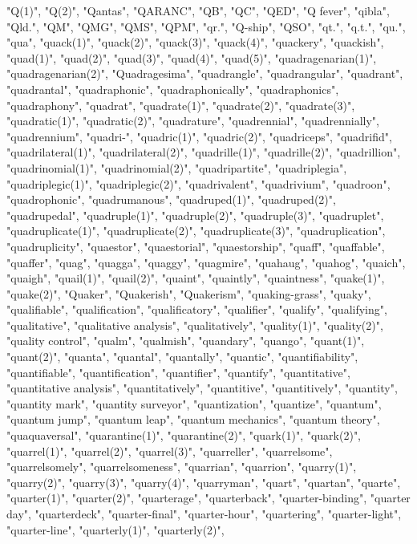 "Q(1)",
"Q(2)",
"Qantas",
"QARANC",
"QB",
"QC",
"QED",
"Q fever",
"qibla",
"Qld.",
"QM",
"QMG",
"QMS",
"QPM",
"qr.",
"Q-ship",
"QSO",
"qt.",
"q.t.",
"qu.",
"qua",
"quack(1)",
"quack(2)",
"quack(3)",
"quack(4)",
"quackery",
"quackish",
"quad(1)",
"quad(2)",
"quad(3)",
"quad(4)",
"quad(5)",
"quadragenarian(1)",
"quadragenarian(2)",
"Quadragesima",
"quadrangle",
"quadrangular",
"quadrant",
"quadrantal",
"quadraphonic",
"quadraphonically",
"quadraphonics",
"quadraphony",
"quadrat",
"quadrate(1)",
"quadrate(2)",
"quadrate(3)",
"quadratic(1)",
"quadratic(2)",
"quadrature",
"quadrennial",
"quadrennially",
"quadrennium",
"quadri-",
"quadric(1)",
"quadric(2)",
"quadriceps",
"quadrifid",
"quadrilateral(1)",
"quadrilateral(2)",
"quadrille(1)",
"quadrille(2)",
"quadrillion",
"quadrinomial(1)",
"quadrinomial(2)",
"quadripartite",
"quadriplegia",
"quadriplegic(1)",
"quadriplegic(2)",
"quadrivalent",
"quadrivium",
"quadroon",
"quadrophonic",
"quadrumanous",
"quadruped(1)",
"quadruped(2)",
"quadrupedal",
"quadruple(1)",
"quadruple(2)",
"quadruple(3)",
"quadruplet",
"quadruplicate(1)",
"quadruplicate(2)",
"quadruplicate(3)",
"quadruplication",
"quadruplicity",
"quaestor",
"quaestorial",
"quaestorship",
"quaff",
"quaffable",
"quaffer",
"quag",
"quagga",
"quaggy",
"quagmire",
"quahaug",
"quahog",
"quaich",
"quaigh",
"quail(1)",
"quail(2)",
"quaint",
"quaintly",
"quaintness",
"quake(1)",
"quake(2)",
"Quaker",
"Quakerish",
"Quakerism",
"quaking-grass",
"quaky",
"qualifiable",
"qualification",
"qualificatory",
"qualifier",
"qualify",
"qualifying",
"qualitative",
"qualitative analysis",
"qualitatively",
"quality(1)",
"quality(2)",
"quality control",
"qualm",
"qualmish",
"quandary",
"quango",
"quant(1)",
"quant(2)",
"quanta",
"quantal",
"quantally",
"quantic",
"quantifiability",
"quantifiable",
"quantification",
"quantifier",
"quantify",
"quantitative",
"quantitative analysis",
"quantitatively",
"quantitive",
"quantitively",
"quantity",
"quantity mark",
"quantity surveyor",
"quantization",
"quantize",
"quantum",
"quantum jump",
"quantum leap",
"quantum mechanics",
"quantum theory",
"quaquaversal",
"quarantine(1)",
"quarantine(2)",
"quark(1)",
"quark(2)",
"quarrel(1)",
"quarrel(2)",
"quarrel(3)",
"quarreller",
"quarrelsome",
"quarrelsomely",
"quarrelsomeness",
"quarrian",
"quarrion",
"quarry(1)",
"quarry(2)",
"quarry(3)",
"quarry(4)",
"quarryman",
"quart",
"quartan",
"quarte",
"quarter(1)",
"quarter(2)",
"quarterage",
"quarterback",
"quarter-binding",
"quarter day",
"quarterdeck",
"quarter-final",
"quarter-hour",
"quartering",
"quarter-light",
"quarter-line",
"quarterly(1)",
"quarterly(2)",
